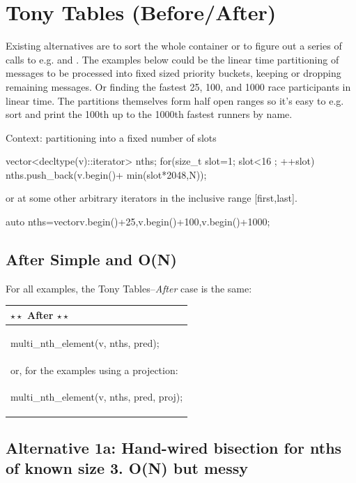 \section{Tony Tables (Before/After)}

Existing alternatives are to sort the whole container or to figure out a series of calls to e.g.  and . 
The examples below could be the linear time partitioning of messages to be
processed into fixed sized priority buckets, keeping or dropping remaining messages. Or finding the fastest 25, 100, and 1000 race participants in linear time. 
The partitions themselves form half open ranges so it's easy to e.g. sort and
print the 100th up to the 1000th fastest runners by name. 

Context: partitioning into a fixed number of slots
\begin{codeblock}
vector<decltype(v)::iterator> nths;
for(size_t slot=1; slot<16 ; ++slot){
	nths.push_back(v.begin()+ min(slot*2048,N));
}
\end{codeblock}
or at some other arbitrary iterators in the inclusive range [first,last].
\begin{codeblock}
auto nths=vector{v.begin()+25,v.begin()+100,v.begin()+1000}; 
\end{codeblock}

\subsection*{After \textnormal{ Simple and O(N)}}

For all examples, the Tony Tables--\emph{After} case is the same:\newline

\hspace{3ex}\begin{tabular}{|l|} 
  \hline 
  \textbf{$\star \star$ After $\star \star$} \\
  \hline 
\begin{codeblock} 
multi_nth_element(v, nths, pred);
\end{codeblock}\\[1em]
or, for the examples using a projection:
\\
\begin{codeblock} 
multi_nth_element(v, nths, pred, proj);
\end{codeblock} 
\\
\hline 
\end{tabular} 


\subsection*{Alternative 1a: Hand-wired bisection for nths of known size 3. O(N) but messy}

